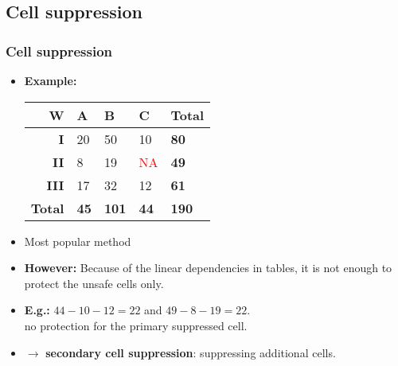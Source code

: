 \subsection{Cell suppression}
\begin{frame}\frametitle{Cell suppression}
	\begin{itemize}
		\item {\bf Example:} \\
		\begin{center}
			\begin{tabular}{|r|lll|l|}
			\hline
			{\bf W} & {\bf A} & {\bf B} & {\bf C} & {\bf Total} \\
			\hline
			{\bf I} 	& 20 & 50 & 10 & {\bf 80} \\
			{\bf II} 	& 8 & 19 & \textcolor{red}{NA} & {\bf 49} \\
			{\bf III}   & 17 & 32 & 12 & {\bf 61} \\
			\hline
			{\bf Total} & {\bf 45} & {\bf 101} & {\bf 44} & {\bf 190} \\
			\hline
			\end{tabular}
		\end{center}
		\item Most popular method
		\item {\bf However:} Because of the linear dependencies in tables, it is not enough to protect the unsafe cells only. \pause
		\item {\bf E.g.:} $44-10-12=22$ and $49-8-19=22$. \\ no protection for the primary suppressed cell. \pause
		\item $\longrightarrow$  {\bf secondary cell suppression}: suppressing additional cells.
	\end{itemize}
\end{frame}


